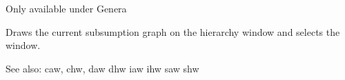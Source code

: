 
Only available under Genera

Draws the current subsumption graph on the hierarchy window and selects
the window.

See also: caw, chw, daw dhw iaw ihw saw shw

